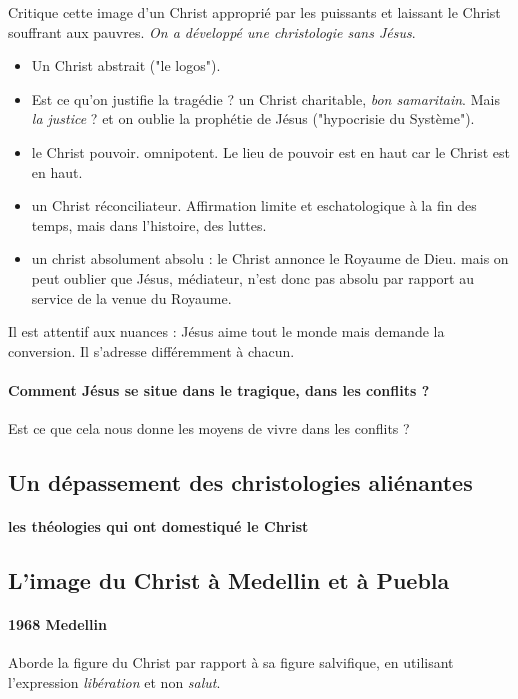 Critique cette image d'un Christ approprié par les puissants et laissant le Christ souffrant aux pauvres.
\textit{On a développé une christologie sans Jésus}. 

\begin{itemize}
    \item Un Christ abstrait ("le logos").  
    \item Est ce qu'on justifie la tragédie ? un Christ charitable, \textit{bon samaritain}. Mais \textit{la justice} ? et on oublie la prophétie de Jésus ("hypocrisie du Système"). 
    \item le Christ pouvoir. omnipotent. Le lieu de pouvoir est en haut car le Christ est en haut.
    \item un Christ réconciliateur. Affirmation limite et eschatologique à la fin des temps, mais dans l'histoire, des luttes.
    \item un christ absolument absolu : le Christ annonce le Royaume de Dieu. mais on peut oublier que Jésus, médiateur, n'est donc pas absolu par rapport au service de la venue du Royaume.
\end{itemize}

Il est attentif aux nuances : Jésus aime tout le monde mais demande la conversion.  Il s'adresse différemment à chacun. 

\paragraph{Comment Jésus se situe dans le tragique, dans les conflits ? } Est ce que cela nous donne les moyens de vivre dans les conflits ? 

\subsection{Un dépassement des christologies aliénantes}


\paragraph{les théologies qui ont domestiqué le Christ}



\subsection{L’image du Christ à Medellin et à Puebla}

\paragraph{1968 Medellin} Aborde la figure du Christ par rapport à sa figure salvifique, en utilisant l'expression \textit{libération} et non \textit{salut}. 


